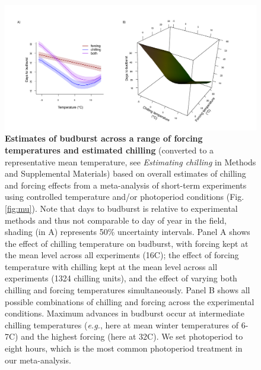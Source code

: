 \documentclass{article}
\newcommand{\R}[1]{\label{#1}\linelabel{#1}}
\begin{document}
\begin{figure}[h!]
\centering
\noindent \includegraphics[width=1\textwidth]{..//..//analyses/bb_analysis/figures/bbmod_2d3dplot_utah_withPEP.pdf}
\caption{\textbf{Estimates of budburst across a range of forcing temperatures and estimated chilling} (converted to a representative mean temperature, see \emph{Estimating chilling} in Methods and Supplemental Materials) based on overall estimates of chilling and forcing effects from a meta-analysis of short-term experiments using controlled temperature and/or photoperiod conditions\R{ee13} (Fig. \ref{fig:mu}).  Note that days to budburst is relative to experimental methods and thus not comparable to day of year in the field, shading (in A) represents 50\% uncertainty intervals. Panel A shows the effect of chilling temperature on budburst, with forcing kept at the mean level across all experiments (16\degree C);  the effect of forcing temperature with chilling kept at the mean level across all experiments (1324 chilling units), and the effect of varying both chilling and forcing temperatures simultaneously. Panel B shows all possible combinations of chilling and forcing across the experimental conditions.
Maximum advances in budburst occur at intermediate chilling temperatures (\emph{e.g.}, here at mean winter temperatures of 6-7\degree C) and the highest forcing (here at 32\degree C). We set photoperiod to eight hours, which is the most common photoperiod treatment in our meta-analysis.} %
\label{fig:3dfieldchillutah}
\end{figure}
\end{document}
